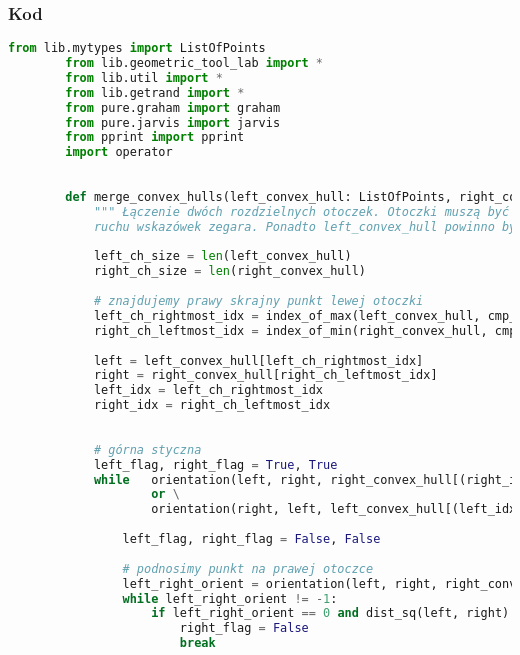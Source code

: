 \documentclass[11pt]{article}
\theoremstyle{remark} \newtheorem{definition}{def.}
\theoremstyle{definition} \newtheorem{twierdzenie}{tw.}
\begin{document}
    \subsubsection{Kod}
    \begin{lstlisting}[language=Python]
        from lib.mytypes import ListOfPoints
        from lib.geometric_tool_lab import *
        from lib.util import *
        from lib.getrand import *
        from pure.graham import graham
        from pure.jarvis import jarvis
        from pprint import pprint
        import operator
        
        
        def merge_convex_hulls(left_convex_hull: ListOfPoints, right_convex_hull: ListOfPoints) -> List[Point]:
            """ Łączenie dwóch rozdzielnych otoczek. Otoczki muszą być zadane w formie wierzchołków podanych w kolejności przeciwnej do 
            ruchu wskazówek zegara. Ponadto left_convex_hull powinno być lewą otoczką, a right_convex_hull prawą. """
        
            left_ch_size = len(left_convex_hull)
            right_ch_size = len(right_convex_hull)
        
            # znajdujemy prawy skrajny punkt lewej otoczki 
            left_ch_rightmost_idx = index_of_max(left_convex_hull, cmp_idx=0)
            right_ch_leftmost_idx = index_of_min(right_convex_hull, cmp_idx=0)
            
            left = left_convex_hull[left_ch_rightmost_idx]
            right = right_convex_hull[right_ch_leftmost_idx]
            left_idx = left_ch_rightmost_idx
            right_idx = right_ch_leftmost_idx
            
        
            # górna styczna
            left_flag, right_flag = True, True
            while   orientation(left, right, right_convex_hull[(right_idx - 1) % right_ch_size]) != -1 and right_flag\
                    or \
                    orientation(right, left, left_convex_hull[(left_idx + 1) % left_ch_size]) != 1 and left_flag:
        
                left_flag, right_flag = False, False
                
                # podnosimy punkt na prawej otoczce
                left_right_orient = orientation(left, right, right_convex_hull[(right_idx - 1) % right_ch_size])
                while left_right_orient != -1:
                    if left_right_orient == 0 and dist_sq(left, right) >= dist_sq(left, right_convex_hull[(right_idx - 1) % right_ch_size]):
                        right_flag = False
                        break
                    

\end{lstlisting}
\end{document}
